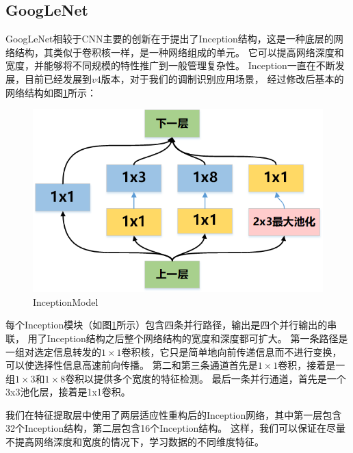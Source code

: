 \subsection{GoogLeNet}
GoogLeNet相较于CNN主要的创新在于提出了Inception结构，这是一种底层的网络结构，其类似于卷积核一样，是一种网络组成的单元。
它可以提高网络深度和宽度，并能够将不同规模的特性推广到一般管理复杂性。
Inception一直在不断发展，目前已经发展到$v4$版本，对于我们的调制识别应用场景，
经过修改后基本的网络结构如图\ref{sec:fig_5_4}所示：\par
\begin{figure}[!h]
	\centering
	\includegraphics[scale=0.8]{figures/chapter_5/fig_5_4}
	\caption{InceptionModel}\label{sec:fig_5_4}
\end{figure}
每个Inception模块（如图\ref{sec:fig_5_4}所示）包含四条并行路径，输出是四个并行输出的串联，
用了Inception结构之后整个网络结构的宽度和深度都可扩大。
第一条路径是一组对选定信息转发的$1\times1$卷积核，它只是简单地向前传递信息而不进行变换，
可以使选择性信息高速前向传播。
第二和第三条通道首先是$1\times1$卷积，接着是一组$1\times3$和$1\times8$卷积以提供多个宽度的特征检测。
最后一条并行通道，首先是一个3x3池化层，接着是1x1卷积。\par
我们在特征提取层中使用了两层适应性重构后的Inception网络，其中第一层包含32个Inception结构，第二层包含16个Inception结构。
这样，我们可以保证在尽量不提高网络深度和宽度的情况下，学习数据的不同维度特征。\par

